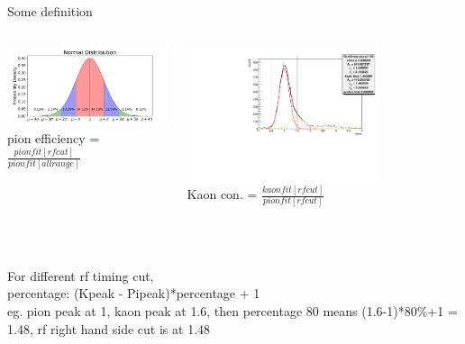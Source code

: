 \documentclass[aspectratio=169,xcolor=dvipsnames]{beamer}
\begin{document}
\begin{frame}{Some definition}
\begin{columns}
\begin{column}[T]{0.5\textwidth}
\includegraphics[width = \textwidth]{graphs/normal-distribution-curve.jpg}
\\pion efficiency = $\frac{pionfit[rfcut]}{pionfit[all range]}$
\end{column}
\begin{column}[T]{0.5\textwidth}
\includegraphics[width = 0.7\textwidth]{results/pid/rftime/rftime_pos_150_pi.pdf}
\\Kaon con. = $\frac{kaonfit[rfcut]}{pionfit[rfcut]}$
\end{column}
\end{columns}
\\
    \\For different rf timing cut,
    \\percentage: (Kpeak - Pipeak)*percentage + 1
  \\eg. pion peak at 1, kaon peak at 1.6, then percentage 80 means (1.6-1)*80\%+1 = 1.48, rf right hand side cut is at 1.48
\end{frame}
\end{document}
